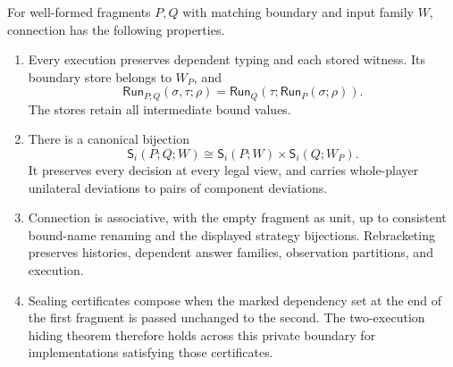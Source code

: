 \begin{theorem}\label{dep:thm:connection}
For well-formed fragments $P,Q$ with matching boundary and input family
$W$, connection has the following properties.
\begin{enumerate}
\item Every execution preserves dependent typing and each stored witness.
Its boundary store belongs to $W_P$, and
\[
 \mathsf{Run}_{P;Q}(\sigma,\tau;\rho)
 =\mathsf{Run}_Q(\tau;\mathsf{Run}_P(\sigma;\rho)).
\]
The stores retain all intermediate bound values.
\item There is a canonical bijection
\[
 \mathsf S_i(P;Q;W)\cong
 \mathsf S_i(P;W)\times\mathsf S_i(Q;W_P).
\]
It preserves every decision at every legal view, and carries whole-player
unilateral deviations to pairs of component deviations.
\item Connection is associative, with the empty fragment as unit,
up to consistent bound-name renaming and the displayed strategy
bijections. Rebracketing preserves histories, dependent answer families,
observation partitions, and execution.
\item Sealing certificates compose when the marked dependency set at
the end of the first fragment is passed unchanged to the second.
The two-execution hiding theorem therefore holds across this private
boundary for implementations satisfying those certificates.
\end{enumerate}
\end{theorem}
